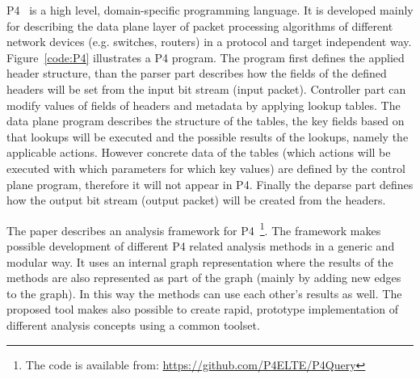 \documentclass[sigconf]{acmart}
\begin{document}
	
	P4~\cite{p4paper} is a high level, domain-specific programming language. It is developed mainly for
describing the data plane layer of packet processing algorithms of different network
devices (e.g. switches, routers) in a protocol and target independent way. Figure~\ref{code:P4} illustrates a P4 program. The program first defines the applied header structure, than the parser part describes how the fields of the defined headers will be set from the input bit stream (input packet). Controller part can modify values of fields of headers and metadata by applying lookup tables. The data plane program describes the structure of the tables, the key fields based on that lookups will be executed and the possible results of the lookups, namely the applicable actions. However concrete data of the tables (which actions will be executed with which parameters for which key values) are defined by the control plane program, therefore it will not appear in P4. Finally the deparse part defines how the output bit stream (output packet) will be created from the headers.   
	
	The paper describes an analysis framework for P4~\footnote{The code is available from: \url{https://github.com/P4ELTE/P4Query}}. The framework makes possible development of different P4 related analysis methods in a generic and modular way. It uses an internal graph representation where the results of the methods are also represented as part of the graph (mainly by adding new edges to the graph). In this way the methods can use each other's results as well. The proposed tool makes also possible to create rapid, prototype implementation of different analysis concepts using a common toolset.  
\end{document}
